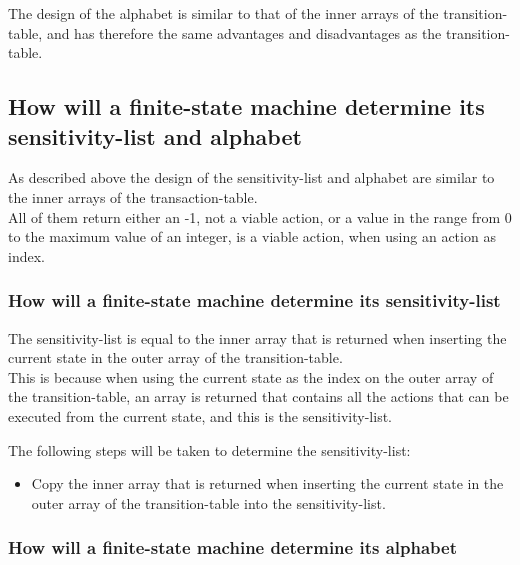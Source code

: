The design of the alphabet is similar to that of the inner arrays of the
transition-table, and has therefore the same advantages and
disadvantages as the transition-table.

\hypertarget{how-will-a-finite-state-machine-determine-its-sensitivity-list-and-alphabet}{%
\subsection{How will a finite-state machine determine its
sensitivity-list and
alphabet}\label{how-will-a-finite-state-machine-determine-its-sensitivity-list-and-alphabet}}

As described above the design of the sensitivity-list and alphabet are
similar to the inner arrays of the transaction-table.\\
All of them return either an -1, not a viable action, or a value in the
range from 0 to the maximum value of an integer, is a viable action,
when using an action as index.

\hypertarget{how-will-a-finite-state-machine-determine-its-sensitivity-list}{%
\subsubsection{How will a finite-state machine determine its
sensitivity-list}\label{how-will-a-finite-state-machine-determine-its-sensitivity-list}}

The sensitivity-list is equal to the inner array that is returned when
inserting the current state in the outer array of the
transition-table.\\
This is because when using the current state as the index on the outer
array of the transition-table, an array is returned that contains all
the actions that can be executed from the current state, and this is the
sensitivity-list.

The following steps will be taken to determine the sensitivity-list:

\begin{itemize}
\tightlist
\item
  Copy the inner array that is returned when inserting the current state
  in the outer array of the transition-table into the sensitivity-list.
\end{itemize}

\hypertarget{how-will-a-finite-state-machine-determine-its-alphabet}{%
\subsubsection{How will a finite-state machine determine its
alphabet}\label{how-will-a-finite-state-machine-determine-its-alphabet}}


